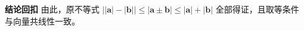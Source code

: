 \begin{proofbox}
	\medskip
	\textbf{\textcolor{CProof}{结论回扣}}
	由此，原不等式 $\bigl| |\mathbf{a}|-|\mathbf{b}| \bigr| \le |\mathbf{a}\pm\mathbf{b}| \le |\mathbf{a}|+|\mathbf{b}|$ 全部得证，且取等条件与向量共线性一致。
\end{proofbox}
